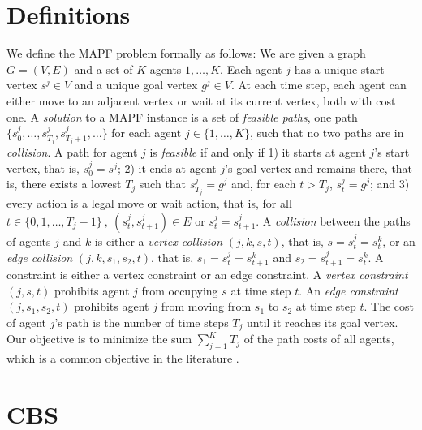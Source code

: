 \documentclass[letterpaper]{article}
\theoremstyle{definition}
\begin{document}
\section{Definitions}

We define the MAPF problem formally as follows: We are given a graph $G =
(V,E)$ and a set of $K$ agents $1, \ldots, K$. Each agent $j$ has a unique
start vertex $s^j \in V$ and a unique goal vertex $g^j \in V$. At each time
step, each agent can either move to an adjacent vertex or wait at its current
vertex, both with cost one. A \emph{solution} to a MAPF instance is a set of
\emph{feasible paths}, one path $\{ s^j_0, \ldots, s^j_{T_j}, s^j_{T_j +1},
\ldots \}$ for each agent $j \in \{1,\ldots,K\}$, such that no two paths are
in \emph{collision}. A path for agent $j$ is \emph{feasible} if and only if 1)
it starts at agent $j$'s start vertex, that is, $s^j_0=s^j$; 2) it ends at
agent $j$'s goal vertex and remains there, that is, there exists a lowest
$T_j$ such that $s^j_{T_j}=g^j$ and, for each $t > T_j$, $s^j_t = g^j$; and 3)
every action is a legal move or wait action, that is, for all $t \in \{0,1,
\ldots, T_j-1\} \ , \ (s^j_t,s^j_{t+1}) \in E$ or $s^j_t = s^j_{t+1}$. A
\emph{collision} between the paths of agents $j$ and $k$ is either a
\emph{vertex collision} $(j,k,s,t)$, that is, $s = s^j_t = s^k_t$, or an
\emph{edge collision} $(j,k,s_1,s_2,t)$, that is, $s_1 = s^j_t = s^k_{t+1}$
and $s_2 = s^j_{t+1} = s^k_t$. A constraint is either a vertex constraint or
an edge constraint. A \emph{vertex constraint} $(j,s,t)$ prohibits agent $j$
from occupying $s$ at time step $t$. An \emph{edge constraint} $(j,s_1,s_2,t)$
prohibits agent $j$ from moving from $s_1$ to $s_2$ at time step $t$. The cost
of agent $j$'s path is the number of time steps $T_j$ until it reaches its
goal vertex. Our objective is to minimize the sum $\sum_{j=1}^K T_j$ of the
path costs of all agents, which is a common objective in the literature
\cite{YL:AAAI:13,SSFS:AIJ:15}.

\section{CBS}
\end{document}
